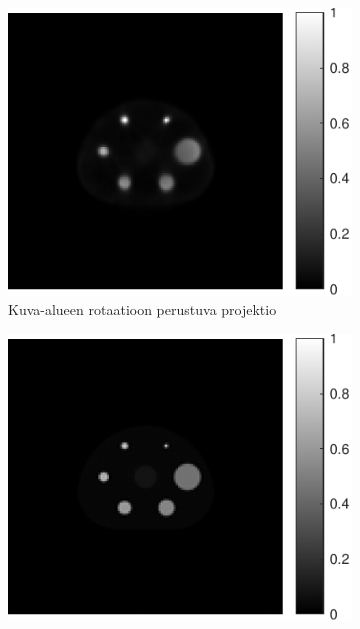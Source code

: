 \begin{figure}[H]
    \centering
    \captionsetup{width=.9\linewidth}
    \begin{subfigure}[t]{.25\textwidth}
        \includegraphics[width=\linewidth]{kuvat/nema_rekonstruktio_proj6.pdf}
        \caption{Kuva-alueen rotaatioon perustuva projektio}
    \end{subfigure}%
    \hspace{.075\textwidth}%
    \begin{subfigure}[t]{.25\textwidth}
        \includegraphics[width=\linewidth]{kuvat/nema_ground_truth.pdf}

\end{subfigure}
\end{figure}
